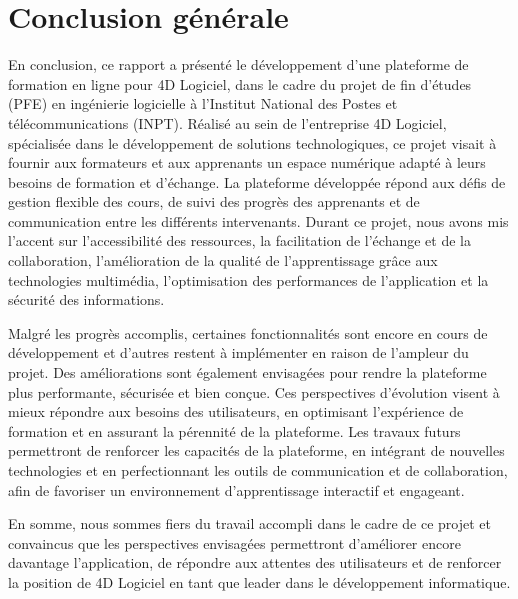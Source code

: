 \chapter*{Conclusion générale}

En conclusion, ce rapport a présenté le développement d'une plateforme de formation en ligne pour 4D Logiciel, dans le cadre du projet de fin d'études (PFE) en ingénierie logicielle à l'Institut National des Postes et télécommunications (INPT). Réalisé au sein de l'entreprise 4D Logiciel, spécialisée dans le développement de solutions technologiques, ce projet visait à fournir aux formateurs et aux apprenants un espace numérique adapté à leurs besoins de formation et d'échange. La plateforme développée répond aux défis de gestion flexible des cours, de suivi des progrès des apprenants et de communication entre les différents intervenants. Durant ce projet, nous avons mis l'accent sur l'accessibilité des ressources, la facilitation de l'échange et de la collaboration, l'amélioration de la qualité de l'apprentissage grâce aux technologies multimédia, l'optimisation des performances de l'application et la sécurité des informations.

Malgré les progrès accomplis, certaines fonctionnalités sont encore en cours de développement et d'autres restent à implémenter en raison de l'ampleur du projet. Des améliorations sont également envisagées pour rendre la plateforme plus performante, sécurisée et bien conçue. Ces perspectives d'évolution visent à mieux répondre aux besoins des utilisateurs, en optimisant l'expérience de formation et en assurant la pérennité de la plateforme. Les travaux futurs permettront de renforcer les capacités de la plateforme, en intégrant de nouvelles technologies et en perfectionnant les outils de communication et de collaboration, afin de favoriser un environnement d'apprentissage interactif et engageant.

En somme, nous sommes fiers du travail accompli dans le cadre de ce projet et convaincus que les perspectives envisagées permettront d'améliorer encore davantage l'application, de répondre aux attentes des utilisateurs et de renforcer la position de 4D Logiciel en tant que leader dans le développement informatique.


